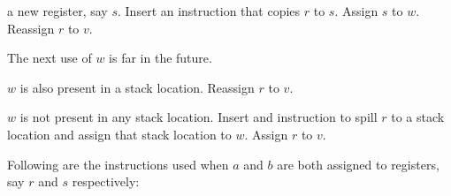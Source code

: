 \begin{legal}
\begin{legal}
\begin{legal}
\begin{legal}
\begin{legal}
          a new register, say $s$.  Insert an instruction that copies
          $r$ to $s$.  Assign $s$ to $w$.  Reassign $r$ to $v$.
        \item The next use of $w$ is far in the future.
          \begin{legal}
          \item $w$ is also present in a stack location.  Reassign
            $r$ to $v$.
          \item $w$ is not present in any stack location.  Insert
            and instruction to spill $r$ to a stack location and
            assign that stack location to $w$.  Assign $r$ to $v$.
          \end{legal}
        \end{legal}
      \end{legal}
    \end{legal}
  \end{legal}
\end{legal}

Following are the instructions used when $a$ and $b$ are both assigned
to registers, say $r$ and $s$ respectively:

